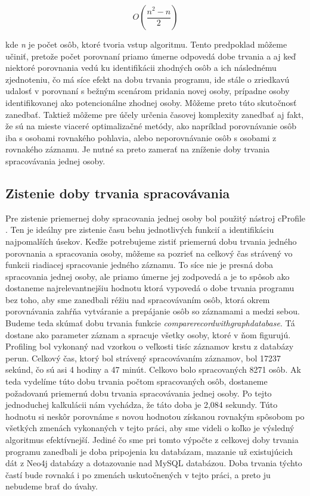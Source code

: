 \begin{equation*}
    O(\frac{n^2 - n}{2})
\end{equation*}

kde \textit{n} je počet osôb, ktoré tvoria vstup algoritmu. Tento predpoklad môžeme učiniť, pretože počet porovnaní priamo úmerne odpovedá dobe trvania a aj keď niektoré porovnania vedú ku identifikácii zhodných osôb a ich následnému zjednoteniu, čo má síce efekt na dobu trvania programu, ide stále o zriedkavú udalosť v porovnaní s bežným scenárom pridania novej osoby, prípadne osoby identifikovanej ako potencionálne zhodnej osoby. Môžeme preto túto skutočnosť zanedbať. Taktiež môžeme pre účely určenia časovej komplexity zanedbať aj fakt, že sú na mieste viaceré optimalizačné metódy, ako napríklad porovnávanie osôb iba s osobami rovnakého pohlavia, alebo neporovnávanie osôb s osobami z rovnakého záznamu. Je nutné sa preto zamerať na zníženie doby trvania spracovávania jednej osoby.

\subsection{Zistenie doby trvania spracovávania}

Pre zistenie priemernej doby spracovania jednej osoby bol použitý nástroj cProfile \cite{cProfile}. Ten je ideálny pre zistenie času behu jednotlivých funkcií a identifikáciu najpomalších úsekov. Keďže potrebujeme zistiť priemernú dobu trvania jedného porovnania a spracovania osoby, môžeme sa pozrieť na celkový čas strávený vo funkcii riadiacej spracovanie jedného záznamu. To síce nie je presná doba spracovania jednej osoby, ale priamo úmerne jej zodpovedá a je to spôsob ako dostaneme najrelevantnejšiu hodnotu ktorá vypovedá o dobe trvania programu bez toho, aby sme zanedbali réžiu nad spracovávaním osôb, ktorá okrem porovnávania zahŕňa vytváranie a prepájanie osôb so záznamami a medzi sebou. Budeme teda skúmať dobu trvania funkcie \textit{compare\textunderscore record\textunderscore with\textunderscore graph\textunderscore database}. Tá dostane ako parameter záznam a spracuje všetky osoby, ktoré v ňom figurujú. Profiling bol vykonaný nad vzorkou o veľkosti tisíc záznamov krstu z databázy perun. Celkový čas, ktorý bol strávený spracovávaním záznamov, bol 17237 sekúnd, čo sú asi 4 hodiny a 47 minút. Celkovo bolo spracovaných 8271 osôb. Ak teda vydelíme túto dobu trvania počtom spracovaných osôb, dostaneme požadovanú priemernú dobu trvania spracovávania jednej osoby. Po tejto jednoduchej kalkulácii nám vychádza, že táto doba je 2,084 sekundy. Túto hodnotu si neskôr porovnáme s novou hodnotou získanou rovnakým spôsobom po všetkých zmenách vykonaných v tejto práci, aby sme videli o koľko je výsledný algoritmus efektívnejší. Jediné čo sme pri tomto výpočte z celkovej doby trvania programu zanedbali je doba pripojenia ku databázam, mazanie už existujúcich dát z Neo4j databázy a dotazovanie nad MySQL databázou. Doba trvania týchto častí bude rovnaká i po zmenách uskutočnených v tejto práci, a preto ju nebudeme brať do úvahy.

